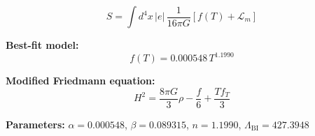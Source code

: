 
\begin{equation}
  S = \int d^4x \, |e| \, \frac{1}{16\pi G} \left[ f(T) + \mathcal{L}_m \right]
\end{equation}

\textbf{Best-fit model:}
\begin{equation}
  f(T) = 0.000548 \, T^{1.1990}
\end{equation}

\textbf{Modified Friedmann equation:}
\begin{equation}
  H^2 = \frac{8\pi G}{3} \rho - \frac{f}{6} + \frac{T f_T}{3}
\end{equation}

\textbf{Parameters:}
$\alpha = 0.000548$, \quad
$\beta = 0.089315$, \quad
$n = 1.1990$, \quad
$\Lambda_{\text{BI}} = 427.3948$